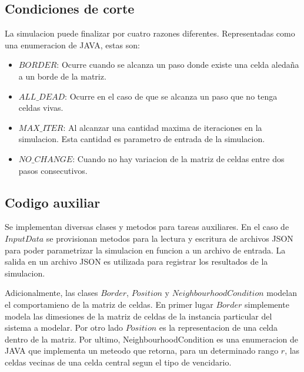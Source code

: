 \subsection{Condiciones de corte}\label{label:condiciones_de_corte}
    La simulacion puede finalizar por cuatro razones diferentes. Representadas como una enumeracion de JAVA, estas son:
    \begin{itemize}
        \item $BORDER$: Ocurre cuando se alcanza un paso donde existe una celda aledaña a un borde de la matriz.
        \item $ALL\_DEAD$: Ocurre en el caso de que se alcanza un paso que no tenga celdas vivas.
        \item $MAX\_ITER$: Al alcanzar una cantidad maxima de iteraciones en la simulacion. Esta cantidad es parametro de
            entrada de la simulacion.
        \item $NO\_CHANGE$: Cuando no hay variacion de la matriz de celdas entre dos pasos consecutivos.
    \end{itemize}

\subsection{Codigo auxiliar}\label{label:codigo_aux}
    Se implementan diversas clases y metodos para tareas auxiliares. En el caso de $InputData$ se provisionan metodos
    para la lectura y escritura de archivos JSON para poder parametrizar la simulacion en funcion a un archivo de entrada.
    La salida en un archivo JSON es utilizada para registrar los resultados de la simulacion.

    Adicionalmente, las clases $Border$, $Position$ y $NeighbourhoodCondition$ modelan el comportamieno de la matriz de
    celdas. En primer lugar $Border$ simplemente modela las dimesiones de la matriz de celdas de la instancia particular
    del sistema a modelar. Por otro lado $Position$ es la representacion de una celda dentro de la matriz. Por ultimo,
    NeighbourhoodCondition es una enumeracion de JAVA que implementa un meteodo que retorna, para un determinado rango
    $r$, las celdas vecinas de una celda central segun el tipo de vencidario.